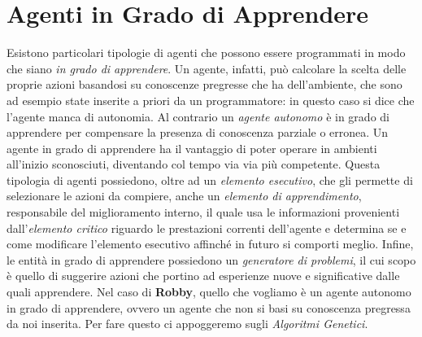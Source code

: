 \section{Agenti in Grado di Apprendere}
Esistono particolari tipologie di agenti che possono essere programmati in modo
che siano \textit{in grado di apprendere}.\newline
Un agente, infatti, può calcolare la scelta delle proprie azioni basandosi su
conoscenze pregresse che ha dell'ambiente, che sono ad esempio state inserite a
priori da un programmatore: in questo caso si dice che l'agente manca di
autonomia. Al contrario un \textit{agente autonomo} è in grado di apprendere
per compensare la presenza di conoscenza parziale o erronea. Un agente in grado
di apprendere ha il vantaggio di poter operare in ambienti all'inizio
sconosciuti, diventando col tempo via via più competente.\newline
Questa tipologia di agenti possiedono, oltre ad un \textit{elemento esecutivo},
che gli permette di selezionare le azioni da compiere, anche un \textit{elemento
di apprendimento}, responsabile del miglioramento interno, il quale usa le
informazioni provenienti dall'\textit{elemento critico} riguardo le
prestazioni correnti dell'agente e determina se e come modificare l'elemento
esecutivo affinché in futuro si comporti meglio. Infine, le entità in grado di
apprendere possiedono un \textit{generatore di problemi}, il cui scopo è quello
di suggerire azioni che portino ad esperienze nuove e significative dalle quali
apprendere.\newline
Nel caso di \textbf{Robby}, quello che vogliamo è un agente autonomo in grado
di apprendere, ovvero un agente che non si basi su conoscenza pregressa da noi
inserita. Per fare questo ci appoggeremo sugli \textit{Algoritmi Genetici}.
